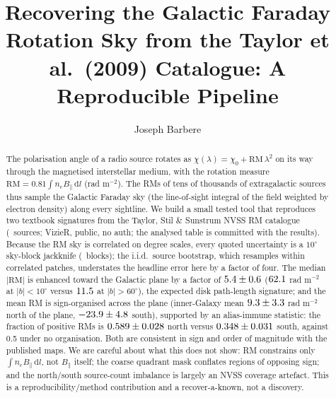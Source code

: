 \documentclass[twocolumn]{aastex631}
\begin{document}
\title{Recovering the Galactic Faraday Rotation Sky from the Taylor et al.\ (2009) Catalogue:
A Reproducible Pipeline}

\author[0009-0008-3289-4447]{Joseph Barbere}

\begin{abstract}
The polarisation angle of a radio source rotates as $\chi(\lambda)=\chi_0+\mathrm{RM}\,\lambda^2$ on its
way through the magnetised interstellar medium, with the rotation measure
$\mathrm{RM}=0.81\int n_e B_\parallel\,\mathrm{d}l$ (rad m$^{-2}$). The RMs of tens of thousands of
extragalactic sources thus sample the Galactic Faraday sky (the line-of-sight integral of the
field weighted by electron density) along every sightline. We build a small tested tool that
reproduces two textbook signatures from the Taylor, Stil \& Sunstrum \citeyearpar{taylor2009} NVSS RM
catalogue (\rmN\ sources; VizieR, public, no auth; the analysed table is committed with the
results). Because the RM sky is correlated on degree scales, every quoted uncertainty is a $10^\circ$ sky-block jackknife (\rmJkBlocks\ blocks); the i.i.d.\ source bootstrap, which resamples within correlated patches, understates the headline error here by a factor of four.
The median $|\mathrm{RM}|$ is enhanced toward the Galactic plane by a factor of
$5.4\pm0.6$ ($62.1$ rad m$^{-2}$ at $|b|<10^\circ$ versus $11.5$ at
$|b|>60^\circ$), the expected disk path-length signature; and the mean RM is sign-organised
across the plane (inner-Galaxy mean $9.3\pm3.3$ rad m$^{-2}$ north of
the plane, $-23.9\pm4.8$ south), supported by an alias-immune statistic:
the fraction of positive RMs is $0.589\pm0.028$ north versus
$0.348\pm0.031$ south, against 0.5 under no organisation. Both are
consistent in sign and order of magnitude with the published maps. We are careful about what
this does not show: RM constrains only $\int n_e B_\parallel\,\mathrm{d}l$, not $B_\parallel$
itself; the coarse quadrant mask conflates regions of opposing sign; and the north/south
source-count imbalance is largely an NVSS coverage artefact. This is a reproducibility/method
contribution and a recover-a-known, not a discovery.
\end{abstract}

\end{document}
